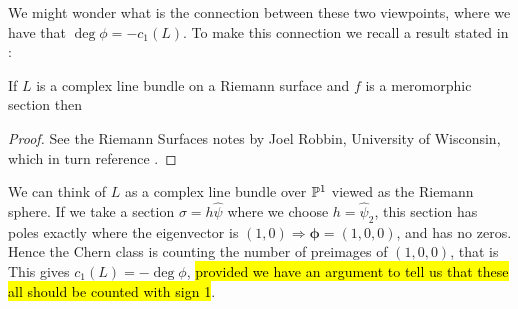 \documentclass{article}
\begin{document}
\begin{remark}
	We might wonder what is the connection between these two viewpoints, where we have that $\deg \phi = -c_1(L)$. To make this connection we recall a result stated in \cite{Babelon2003}:
	\begin{prop}
		If $L$ is a complex line bundle on a Riemann surface and $f$ is a meromorphic section then 
	\end{prop}
\begin{proof}
	See the Riemann Surfaces notes by Joel Robbin, University of Wisconsin, which in turn reference \cite{Griffiths2014}. 
\end{proof}
We can think of $L$ as a complex line bundle over $\mathbb{P}^1$ viewed as the Riemann sphere. If we take a section $\sigma = h \hat{\psi}$ where we choose $h=\hat{\psi}_2$, this section has poles exactly where the eigenvector is $(1,0) \Rightarrow \bm{\phi} = (1,0,0)$, and has no zeros. Hence the Chern class is counting the number of preimages of $(1,0,0)$, that is 
This gives $c_1(L)=-\deg \phi$, \hl{provided we have an argument to tell us that these all should be counted with sign 1}. 
\end{remark}
\end{document}

